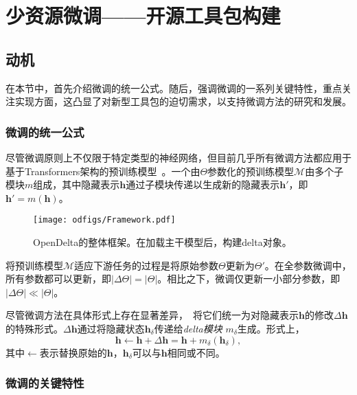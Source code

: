 \chapter{少资源微调——开源工具包构建}


\section{动机}

在本节中，首先介绍微调的统一公式。随后，强调微调的一系列关键特性，重点关注实现方面，这凸显了对新型工具包的迫切需求，以支持微调方法的研究和发展。


\subsection{微调的统一公式}

尽管微调原则上不仅限于特定类型的神经网络，但目前几乎所有微调方法都应用于基于Transformers架构的预训练模型~\cite{devlin2018bert, liu2019roberta, raffel2019exploring, brown2020language}。一个由$\Theta$参数化的预训练模型$\mathcal{M}$由多个子模块$m$组成，其中隐藏表示$\mathbf{h}$通过子模块传递以生成新的隐藏表示$\mathbf{h}'$，即$\mathbf{h}' = m(\mathbf{h})$。

\begin{figure*}[!htbp]
    \centering
    \texttt{[image: odfigs/Framework.pdf]}
    \caption{OpenDelta的整体框架。在加载主干模型后，构建delta对象。}
    \label{fig:framework}
\end{figure*}

将预训练模型$\mathcal{M}$适应下游任务的过程是将原始参数$\Theta$更新为$\Theta'$。在全参数微调中，所有参数都可以更新，即$|\Delta \Theta| = |\Theta|$。相比之下，微调仅更新一小部分参数，即$|\Delta \Theta| \ll |\Theta|$。

尽管微调方法在具体形式上存在显著差异，~\citet{he2022unified}将它们统一为对隐藏表示$\mathbf{h}$的修改$\Delta \mathbf{h}$的特殊形式。$\Delta \mathbf{h}$通过将隐藏状态$\mathbf{h}_{{\delta}}$传递给\textit{delta模块} $m_\delta$生成。形式上，
\begin{equation}
\label{equ:unifydelta}
\mathbf{h} \leftarrow \mathbf{h} + \Delta \mathbf{h} = \mathbf{h} + m_\delta(\mathbf{h}_{{\delta}}),
\end{equation}
其中$\leftarrow$表示替换原始的$\mathbf{h}$，$\mathbf{h}_{{\delta}}$可以与$\mathbf{h}$相同或不同。


\subsection{微调的关键特性}

